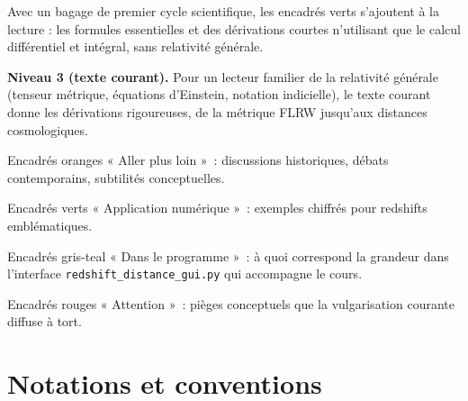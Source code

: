 \documentclass[11pt,a4paper,openany]{report}
\begin{document}
\begin{tcolorbox}[mathspe]
Avec un bagage de premier cycle scientifique, les encadrés verts s'ajoutent à
la lecture : les formules essentielles et des dérivations courtes n'utilisant
que le calcul différentiel et intégral, sans relativité générale.
\end{tcolorbox}

\noindent\textbf{Niveau 3 (texte courant).} Pour un lecteur familier de la
relativité générale (tenseur métrique, équations d'Einstein, notation
indicielle), le texte courant donne les dérivations rigoureuses, de la métrique
FLRW jusqu'aux distances cosmologiques.

\begin{tcolorbox}[approfondir]
Encadrés oranges « Aller plus loin »~: discussions historiques, débats
contemporains, subtilités conceptuelles.
\end{tcolorbox}

\begin{tcolorbox}[numerique]
Encadrés verts « Application numérique »~: exemples chiffrés pour redshifts
emblématiques.
\end{tcolorbox}

\begin{tcolorbox}[gui]
Encadrés gris-teal « Dans le programme »~: à quoi correspond la grandeur dans
l'interface \texttt{redshift\_distance\_gui.py} qui accompagne le cours.
\end{tcolorbox}

\begin{tcolorbox}[attention]
Encadrés rouges « Attention »~: pièges conceptuels que la vulgarisation
courante diffuse à tort.
\end{tcolorbox}

\clearpage

\chapter*{Notations et conventions}
\end{document}
